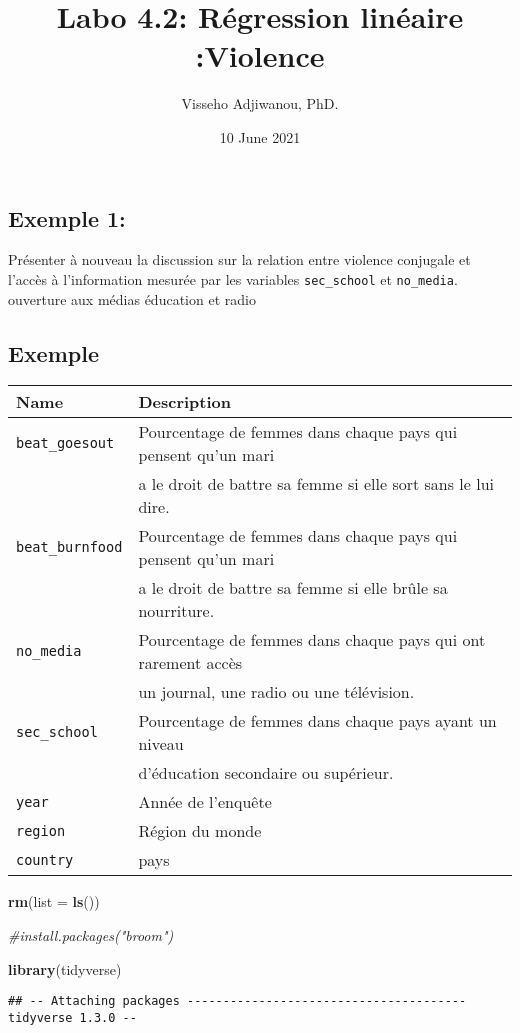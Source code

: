 \documentclass[
]{article}
\title{Labo 4.2: Régression linéaire :Violence}
\author{Visseho Adjiwanou, PhD.}
\date{10 June 2021}
\newenvironment{Shaded}{\begin{snugshade}}{\end{snugshade}}
\newcommand{\CommentTok}[1]{\textcolor[rgb]{0.56,0.35,0.01}{\textit{#1}}}
\newcommand{\DataTypeTok}[1]{\textcolor[rgb]{0.13,0.29,0.53}{#1}}
\newcommand{\KeywordTok}[1]{\textcolor[rgb]{0.13,0.29,0.53}{\textbf{#1}}}
\newcommand{\NormalTok}[1]{#1}
\begin{document}
\maketitle

\hypertarget{exemple-1}{%
\subsection{Exemple 1:}\label{exemple-1}}

Présenter à nouveau la discussion sur la relation entre violence
conjugale et l'accès à l'information mesurée par les variables
\texttt{sec\_school} et \texttt{no\_media}. ouverture aux médias
éducation et radio

\hypertarget{exemple}{%
\subsection{Exemple}\label{exemple}}

\begin{longtable}[]{@{}ll@{}}
\toprule
Name & Description\tabularnewline
\midrule
\endhead
\texttt{beat\_goesout} & Pourcentage de femmes dans chaque pays qui
pensent qu'un mari\tabularnewline
& a le droit de battre sa femme si elle sort sans le lui
dire.\tabularnewline
\texttt{beat\_burnfood} & Pourcentage de femmes dans chaque pays qui
pensent qu'un mari\tabularnewline
& a le droit de battre sa femme si elle brûle sa
nourriture.\tabularnewline
\texttt{no\_media} & Pourcentage de femmes dans chaque pays qui ont
rarement accès\tabularnewline
& un journal, une radio ou une télévision.\tabularnewline
\texttt{sec\_school} & Pourcentage de femmes dans chaque pays ayant un
niveau\tabularnewline
& d'éducation secondaire ou supérieur.\tabularnewline
\texttt{year} & Année de l'enquête\tabularnewline
\texttt{region} & Région du monde\tabularnewline
\texttt{country} & pays\tabularnewline
\bottomrule
\end{longtable}

\begin{Shaded}
\begin{Highlighting}[]
\KeywordTok{rm}\NormalTok{(}\DataTypeTok{list =} \KeywordTok{ls}\NormalTok{())}

\CommentTok{#install.packages("broom")}

\KeywordTok{library}\NormalTok{(tidyverse)}
\end{Highlighting}
\end{Shaded}

\begin{verbatim}
## -- Attaching packages --------------------------------------- tidyverse 1.3.0 --
\end{verbatim}
\end{document}
